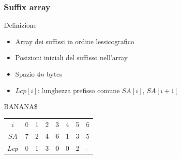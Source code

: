 \begin{frame}[fragile]
\frametitle{Suffix array}
\begin{block}{Definizione}
\begin{itemize}
\item
Array dei suffissi in ordine lessicografico
\item
Posizioni iniziali del suffisso nell'array
\item
Spazio $4n$ bytes
\item
$Lcp[i]$: lunghezza prefisso comune $SA[i]$, $SA[i+1]$
\end{itemize}
\end{block}
\begin{block}{BANANA\$}
\begin{tabular}[l]{|c|l|l|l|l|l|l|l|}
\hline
$i$&0&1&2&3&4&5&6\\
$SA$&7&2&4&6&1&3&5\\
$Lcp$&0&1&3&0&0&2&-\\\hline
\end{tabular}
\end{block}
\end{frame}


